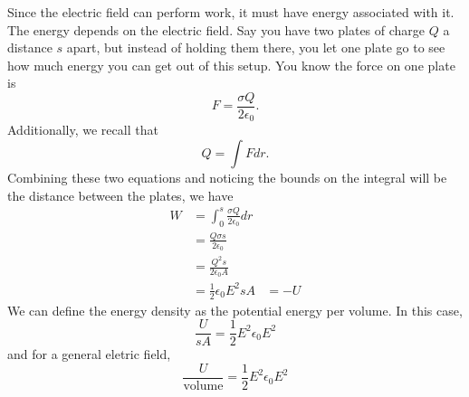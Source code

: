 \documentclass[nobib]{tufte-handout}
\begin{document}
Since the electric field can perform work, it must have
energy associated with it. The energy depends on the electric field. 
Say you have two plates of charge $Q$ a distance $s$ apart, but instead of 
holding them there, you let one plate go to see how much energy 
you can get out of this setup. You know the force on one plate is 
\[F = \frac{\sigma Q}{2 \epsilon_0}.\]
Additionally, we recall that 
\[Q = \int F dr.\]
Combining these two equations and noticing the bounds on the integral 
will be the distance between the plates, we have 
\begin{align*}
    W &= \int_{0}^{s} \frac{\sigma Q}{2 \epsilon_0} dr \\
    &= \frac{Q\sigma s}{2 \epsilon_0} \\
    &= \frac{Q^2 s}{2 \epsilon_0 A} \\
    &= \frac{1}{2} \epsilon_0 E^2 s A
    &= -U
\end{align*}
We can define the energy density as the potential energy per 
volume. In this case, 
\[\frac{U}{s A} = \frac{1}{2} E^2 \epsilon_0 E^2\]
and for a general eletric field, 
\[\frac{U}{\text{volume}} = \frac{1}{2} E^2 \epsilon_0 E^2\]
\end{document}
